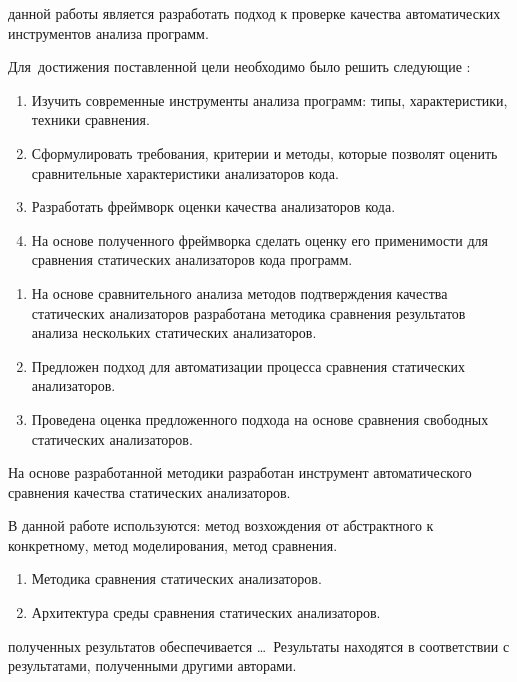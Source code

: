 {\aim} данной работы является разработать подход к проверке качества автоматических инструментов анализа программ.

Для~достижения поставленной цели необходимо было решить следующие {\tasks}:
\begin{enumerate}[beginpenalty=10000] %
  \item Изучить современные инструменты анализа программ: типы, характеристики, техники сравнения.  
  \item Сформулировать требования, критерии и методы, которые позволят оценить сравнительные характеристики 
      анализаторов кода.
  \item Разработать фреймворк оценки качества анализаторов кода. 
  \item На основе полученного фреймворка сделать оценку его применимости для сравнения статических анализаторов кода программ.
\end{enumerate}


{\novelty}
\begin{enumerate}[beginpenalty=10000] %
  \item На основе сравнительного анализа методов подтверждения качества
статических анализаторов разработана методика сравнения результатов
анализа нескольких статических анализаторов. 
  \item Предложен подход для автоматизации процесса сравнения статических
анализаторов.
  \item Проведена оценка предложенного подхода на основе сравнения свободных статических анализаторов.
\end{enumerate}

{\influence} На основе разработанной методики разработан
инструмент автоматического сравнения качества статических анализаторов.

{\methods} В данной работе используются: метод возхождения от абстрактного к конкретному, метод моделирования, метод сравнения.

{}
\begin{enumerate}[beginpenalty=10000] %
  \item Методика сравнения статических анализаторов.
  \item Архитектура среды сравнения статических анализаторов.
\end{enumerate}

{\reliability} полученных результатов обеспечивается \ldots \ Результаты находятся в соответствии с результатами, полученными другими авторами.


